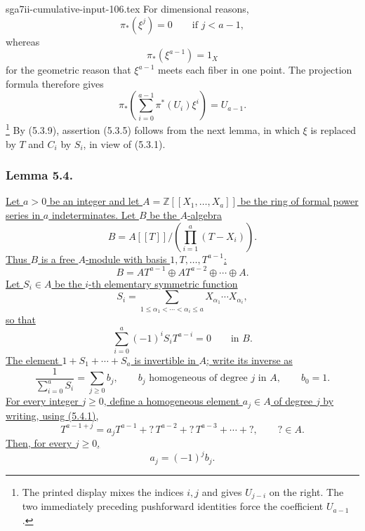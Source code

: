 \begin{filecontents*}{sga7ii-cumulative-input-106.tex}
For dimensional reasons,
\[
\pi_*(\xi^j)=0\qquad\text{if }j<a-1,
\]
whereas
\[
\pi_*(\xi^{a-1})=1_X
\]
for the geometric reason that $\xi^{a-1}$ meets each fiber in one
point.  The projection formula therefore gives
\begin{equation}\tag{5.3.9}
\pi_*\!\left(
\sum_{i=0}^{a-1}\pi^*(U_i)\xi^i
\right)=U_{a-1}.
\end{equation}
\footnote{The printed display mixes the indices $i,j$ and gives
$U_{j-i}$ on the right.  The two immediately preceding pushforward
identities force the coefficient $U_{a-1}$.}
By (5.3.9), assertion (5.3.5) follows from the next lemma, in which
$\xi$ is replaced by $T$ and $C_i$ by $S_i$, in view of (5.3.1).

\subsubsection*{Lemma 5.4.}
\underline{Let $a>0$ be an integer and let
$A=\mathbb Z[[X_1,\ldots,X_a]]$ be the ring of formal power series in
$a$ indeterminates.  Let $B$ be the $A$-algebra}
\[
B=A[[T]]\bigg/\left(\prod_{i=1}^{a}(T-X_i)\right).
\]
\underline{Thus $B$ is a free $A$-module with basis
$1,T,\ldots,T^{a-1}$:}
\begin{equation}\tag{5.4.1}
B=AT^{a-1}\oplus AT^{a-2}\oplus\cdots\oplus A.
\end{equation}
\underline{Let $S_i\in A$ be the $i$-th elementary symmetric
function}
\[
S_i=\sum_{1\leq\alpha_1<\cdots<\alpha_i\leq a}
X_{\alpha_1}\cdots X_{\alpha_i},
\]
\underline{so that}
\begin{equation}\tag{5.4.2}
\sum_{i=0}^{a}(-1)^iS_iT^{a-i}=0
\qquad\text{in }B.
\end{equation}
\underline{The element $1+S_1+\cdots+S_a$ is invertible in $A$;
write its inverse as}
\begin{equation}\tag{5.4.3}
\frac{1}{\sum_{i=0}^{a}S_i}
=\sum_{j\geq0}b_j,
\qquad
b_j\text{ homogeneous of degree }j\text{ in }A,
\qquad b_0=1.
\end{equation}
\underline{For every integer $j\geq0$, define a homogeneous element
$a_j\in A$ of degree $j$ by writing, using (5.4.1),}
\begin{equation}\tag{5.4.4}
T^{a-1+j}
=a_jT^{a-1}+{}?\,T^{a-2}+{}?\,T^{a-3}+\cdots+{}?,
\qquad ?\in A.
\end{equation}
\underline{Then, for every $j\geq0$,}
\begin{equation}\tag{5.4.5}
a_j=(-1)^jb_j.
\end{equation}

\end{filecontents*}
